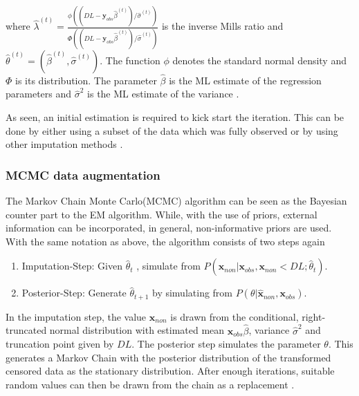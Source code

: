 where $\hat{\lambda}^{(t)}=\frac{\phi((DL-\bm{y}_{obs}\hat{\beta}^{(t)})/\hat{\sigma}^{(t)})}{\Phi((DL-\bm{y}_{obs}\hat{\beta}^{(t)})/\hat{\sigma}^{(t)})}$ is the inverse Mills ratio and $\hat{\theta}^{(t)}=(\hat{\beta}^{(t)},\hat{\sigma}^{(t)})$. The function $\phi$ denotes the standard normal density and $\Phi$ is its distribution. The parameter $\hat{\beta}$ is the ML estimate of the regression parameters and $\hat{\sigma}^2$ is the ML estimate of the variance \cite{Palarea-Albaladejo:2015}.

As seen, an initial estimation is required to kick start the iteration. This can be done by either using a subset of the data which was fully observed or by using other imputation methods \cite{Palarea-Albaladejo:2015}. 


\subsubsection{MCMC data augmentation}
\label{sec:MCMC data augmentation}

The Markov Chain Monte Carlo(MCMC) algorithm can be seen as the Bayesian counter part to the EM algorithm. While, with the use of priors, external information can be incorporated, in general, non-informative priors are used. With the same notation as above, the algorithm consists of two steps again

\begin{enumerate}
	\item Imputation-Step: Given $\hat{\theta}_t$ , simulate from $P(\bm{x}_{non}|\bm{x}_{obs},\bm{x}_{non} < DL; \hat{\theta}_t)$.
	\item Posterior-Step: Generate $\hat{\theta}_{t+1}$ by simulating from $P(\theta|\hat{\bm{x}}_{non},\bm{x}_{obs})$. 
\end{enumerate}

In the imputation step, the value $\hat{\bm{x}}_{non}$ is drawn from the conditional, right-truncated normal distribution with estimated mean $\bm{x}_{obs}\hat{\beta}$, variance $\hat{\sigma}^2$ and truncation point given by $DL$. The posterior step simulates the parameter $\theta$. This generates a Markov Chain with the posterior distribution of the transformed censored data as the stationary distribution. After enough iterations, suitable random values can then be drawn from the chain as a replacement \cite{Palarea-Albaladejo:2015}. %


